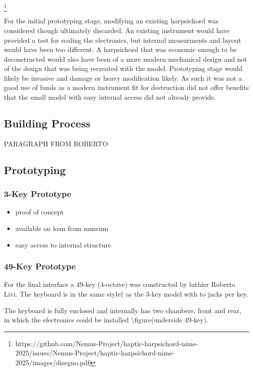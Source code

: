 \footnote{https://github.com/Nemus-Project/haptic-harpsichord-nime-2025/issues/Nemus-Project/haptic-harpsichord-nime-2025/images/disegno.pdf}

For the initial prototyping stage, modifying an existing harpsichord was
considered though ultimately discarded. An existing instrument would
have provided a test for scaling the electronics, but internal
measurments and layout would have been too different. A harpsichord that
was economic enough to be deconstructed would also have been of a more
modern mechanical design and not of the design that was being recreated
with the model. Prototyping stage would likely be invasive and damage or
heavy modification likely. As such it was not a good use of funds as a
modern instrument fit for destruction did not offer benefits that the
small model with easy internal access did not already provide.

\subsection{Building Process}\label{building-process}

PARAGRAPH FROM ROBERTO

\subsection{Prototyping}\label{prototyping}

\subsubsection{3-Key Prototype}\label{key-prototype}

\begin{itemize}
\item
  proof of concept
\item
  available on loan from museum
\item
  easy access to internal structure
\end{itemize}

\subsubsection{49-Key Prototype}\label{key-prototype-1}

For the final interface a 49-key (4-octave) was constructed by luthier
Roberto Livi. The keyboard is in the same style† as the 3-key model with
to jacks per key.

The keyboard is fully enclosed and internally has two chambers, front
and rear, in which the electronics could be installed
\textbackslash figure(underside 49-key).

